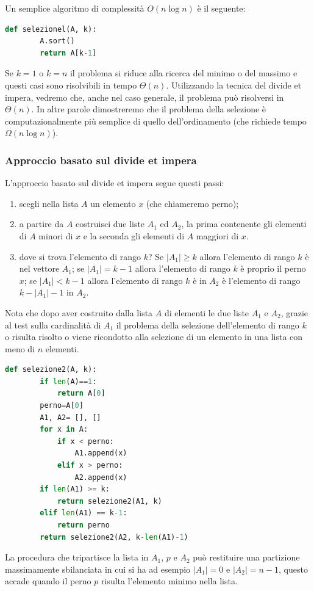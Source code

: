 Un semplice algoritmo di complessità $O(n\log n)$ è il seguente:
\begin{lstlisting}[language=Python]
    def selezionel(A, k):
        A.sort()
        return A[k-1]
\end{lstlisting}

Se $k=1$ o $k=n$ il problema si riduce alla ricerca del minimo o del massimo e questi casi sono risolvibili in tempo $\Theta(n)$.
Utilizzando la tecnica del divide et impera, vedremo che, anche nel caso generale, il problema può risolversi in $\Theta(n)$. In altre parole dimostreremo che il problema della selezione è computazionalmente più semplice di quello dell'ordinamento (che richiede tempo $\Omega(n\log n)$).

\subsubsection{Approccio basato sul divide et impera}
L'approccio basato sul divide et impera segue questi passi:
\begin{enumerate}
    \item scegli nella lista $A$ un elemento $x$ (che chiameremo perno);
    \item a partire da $A$ costruisci due liste $A_1$ ed $A_2$, la prima contenente gli elementi di $A$ minori di $x$ e la seconda gli elementi di $A$ maggiori di $x$.
    \item dove si trova l'elemento di rango $k$? Se $|A_1| \geq k$ allora l'elemento di rango $k$ è nel vettore $A_1$; se $|A_1| = k - 1$ allora l'elemento di rango $k$ è proprio il perno $x$; se $|A_1| < k - 1$ allora l'elemento di rango $k$ è in $A_2$ è l'elemento di rango $k - |A_1| - 1$ in $A_2$.
\end{enumerate}
Nota che dopo aver costruito dalla lista $A$ di elementi le due liste $A_1$ e $A_2$, grazie al test sulla cardinalità di $A_1$ il problema della selezione dell'elemento di rango $k$ o risulta risolto o viene ricondotto alla selezione di un elemento in una lista con meno di $n$ elementi.

\begin{lstlisting}[language=Python]
    def selezione2(A, k):
        if len(A)==1:
            return A[0]
        perno=A[0]
        A1, A2= [], []
        for x in A:
            if x < perno:
                A1.append(x)
            elif x > perno:
                A2.append(x)
        if len(A1) >= k:
            return selezione2(A1, k)
        elif len(A1) == k-1:
            return perno
        return selezione2(A2, k-len(A1)-1)
\end{lstlisting}
La procedura che tripartisce la lista in $A_1$, $p$ e $A_2$ può restituire una partizione massimamente sbilanciata in cui si ha ad esempio $|A_1|=0$ e $|A_2|=n-1$, questo accade quando il perno $p$ risulta l'elemento minimo nella lista.

